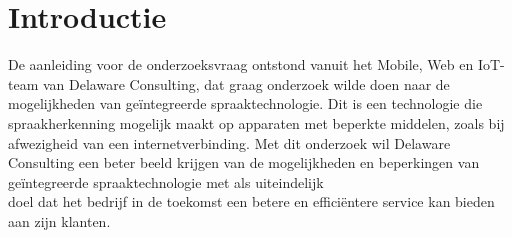 
\section{Introductie}%
\label{sec:introductie}






De aanleiding voor de onderzoeksvraag ontstond vanuit het Mobile, Web en IoT-team van Delaware Consulting, dat graag onderzoek wilde doen naar de mogelijkheden van geïntegreerde spraaktechnologie. Dit is een technologie die spraakherkenning mogelijk maakt op apparaten met beperkte middelen, zoals bij afwezigheid van een internetverbinding. Met dit onderzoek wil Delaware Consulting een beter beeld krijgen van de mogelijkheden en beperkingen van geïntegreerde spraaktechnologie met als uiteindelijk \\doel dat het bedrijf in de toekomst een betere en efficiëntere service kan bieden aan zijn klanten.

